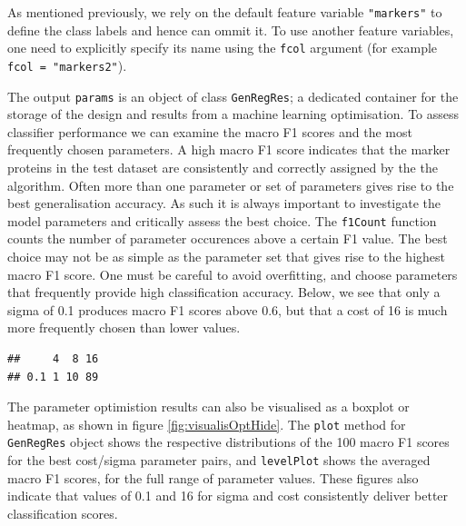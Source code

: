 As mentioned previously, we rely on the default feature variable
\texttt{"markers"} to define the class labels and hence can ommit
it. To use another feature variables, one need to explicitly specify
its name using the \texttt{fcol} argument (for example \texttt{fcol =
  "markers2"}).

The output \texttt{params} is an object of class \texttt{GenRegRes}; a
dedicated container for the storage of the design and results from a
machine learning optimisation. To assess classifier performance we can
examine the macro F1 scores and the most frequently chosen
parameters. A high macro F1 score indicates that the marker proteins
in the test dataset are consistently and correctly assigned by the the
algorithm. Often more than one parameter or set of parameters gives
rise to the best generalisation accuracy. As such it is always
important to investigate the model parameters and critically assess
the best choice. The \texttt{f1Count} function counts the number of
parameter occurences above a certain F1 value. The best choice may not
be as simple as the parameter set that gives rise to the highest macro
F1 score. One must be careful to avoid overfitting, and choose
parameters that frequently provide high classification
accuracy. Below, we see that only a sigma of 0.1 produces macro F1
scores above 0.6, but that a cost of 16 is much more frequently chosen
than lower values.

\begin{knitrout}
\color{fgcolor}\begin{kframe}
\begin{alltt}
 \hlstd{)}
\end{alltt}
\begin{verbatim}
##     4  8 16
## 0.1 1 10 89
\end{verbatim}
\end{kframe}
\end{knitrout}

The parameter optimistion results can also be visualised as a boxplot
or heatmap, as shown in figure \ref{fig:visualisOptHide}.  The
\texttt{plot} method for \texttt{GenRegRes} object shows the
respective distributions of the 100 macro F1 scores for the best
cost/sigma parameter pairs, and \texttt{levelPlot} shows the averaged
macro F1 scores, for the full range of parameter values. These figures
also indicate that values of 0.1 and 16 for sigma and cost
consistently deliver better classification scores. 

